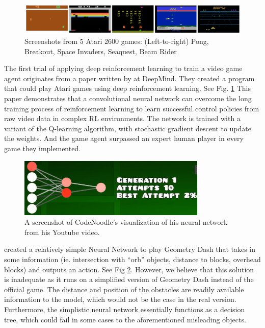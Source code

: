 \documentclass{article} %
\begin{document}
\begin{figure}[!h]
\begin{center}
\includegraphics[width=1.0\textwidth]{Figs/Deepmind_atari.png}
\end{center}
\caption{Screenshots from 5 Atari 2600 games: 
(Left-to-right) Pong, Breakout, Space Invaders, Seaquest, Beam Rider
\citep{Playing+Atari+with+Deep+Reinforcement+Learning}}
\label{fig:Deep_mind_Atari_AI}
\end{figure}

The first trial of applying deep reinforcement learning to train a
video game agent originates from a paper written by
\cite{Playing+Atari+with+Deep+Reinforcement+Learning} at 
DeepMind. They created a program that could play Atari games using
deep reinforcement learning. See Fig. \ref{fig:Deep_mind_Atari_AI}
This paper demonstrates that a convolutional neural network can 
overcome the long training process of reinforcement learning to 
learn successful control policies from raw video data in complex 
RL environments. The network is trained with a variant of the 
Q-learning algorithm, with stochastic gradient descent to update 
the weights. And the game agent surpassed an expert human player 
in every game they implemented.

\begin{figure}[!h]
\begin{center}
\includegraphics[width=0.8\textwidth]{Figs/CodeNoodlesScreenshot.png}
\end{center}
\caption{A screenshot of CodeNoodle's visualization of his neural network
from his Youtube video. 
\citep{AI+Learns+to+Play+GD}}
\label{fig:Code_Noodles}
\end{figure}

\cite{AI+Learns+to+Play+GD} created a relatively simple 
Neural Network to play Geometry Dash that takes in 
some information (ie. intersection with  “orb” objects, 
distance to blocks, overhead blocks) and outputs an action.
See Fig \ref{fig:Code_Noodles}.
However, we believe 
that this solution is inadequate as it runs on a simplified 
version of Geometry Dash instead of the official game. The 
distance and position of the obstacles are readily available 
information to the model, which would not be the case in the 
real version. Furthermore, the simplistic neural network 
essentially functions as a decision tree, which could fail 
in some cases to the aforementioned misleading objects.
\end{document}
